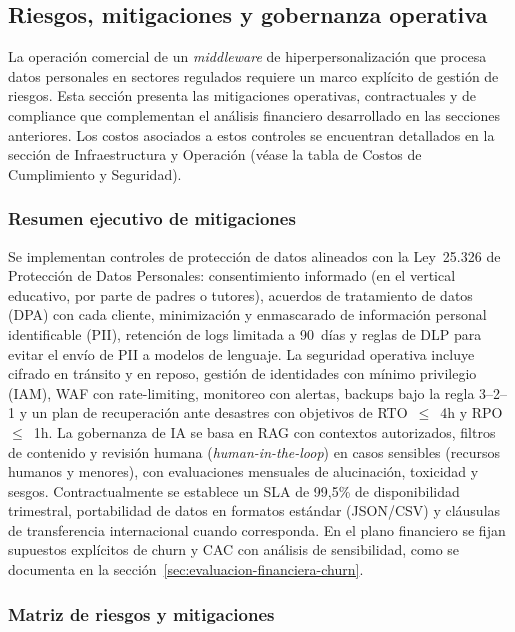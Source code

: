\subsection{Riesgos, mitigaciones y gobernanza operativa}
\label{sec:riesgos-mitigaciones}

La operación comercial de un \textit{middleware} de hiperpersonalización que procesa datos personales en sectores regulados requiere un marco explícito de gestión de riesgos. Esta sección presenta las mitigaciones operativas, contractuales y de compliance que complementan el análisis financiero desarrollado en las secciones anteriores. Los costos asociados a estos controles se encuentran detallados en la sección de Infraestructura y Operación (véase la tabla de Costos de Cumplimiento y Seguridad).

\subsubsection{Resumen ejecutivo de mitigaciones}

Se implementan controles de protección de datos alineados con la Ley~25.326 de Protección de Datos Personales: consentimiento informado (en el vertical educativo, por parte de padres o tutores), acuerdos de tratamiento de datos (DPA) con cada cliente, minimización y enmascarado de información personal identificable (PII), retención de logs limitada a 90~días y reglas de DLP para evitar el envío de PII a modelos de lenguaje. La seguridad operativa incluye cifrado en tránsito y en reposo, gestión de identidades con mínimo privilegio (IAM), WAF con rate-limiting, monitoreo con alertas, backups bajo la regla 3--2--1 y un plan de recuperación ante desastres con objetivos de RTO~$\leq$~4h y RPO~$\leq$~1h. La gobernanza de IA se basa en RAG con contextos autorizados, filtros de contenido y revisión humana (\textit{human-in-the-loop}) en casos sensibles (recursos humanos y menores), con evaluaciones mensuales de alucinación, toxicidad y sesgos. Contractualmente se establece un SLA de 99,5\% de disponibilidad trimestral, portabilidad de datos en formatos estándar (JSON/CSV) y cláusulas de transferencia internacional cuando corresponda. En el plano financiero se fijan supuestos explícitos de churn y CAC con análisis de sensibilidad, como se documenta en la sección~\ref{sec:evaluacion-financiera-churn}.

\subsubsection{Matriz de riesgos y mitigaciones}

